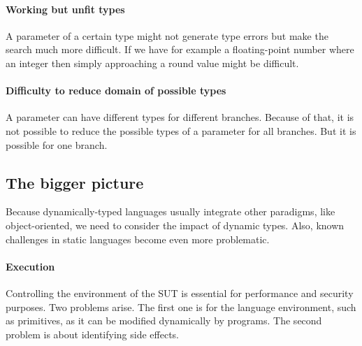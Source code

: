 \documentclass{llncs2e/llncs}
\begin{document}
\paragraph{Working but unfit types} A parameter of a certain type might not
generate type errors but make the search much more difficult. If we have for
example a floating-point number where an integer then simply approaching a round
value might be difficult.


\paragraph{Difficulty to reduce domain of possible types} A parameter can have
different types for different branches. Because of that, it is not possible to
reduce the possible types of a parameter for all branches. But it is possible
for one branch.

\subsection{The bigger picture}
Because dynamically-typed languages usually integrate other paradigms, like
object-oriented, we need to consider the impact of dynamic types. Also, known
challenges in static languages become even more problematic.
\paragraph{Execution} Controlling the environment of the SUT is essential for
performance and security purposes. Two problems arise. The first one is for the
language environment, such as primitives, as it can be modified dynamically by
programs. The second problem is about identifying side effects.
\end{document}
